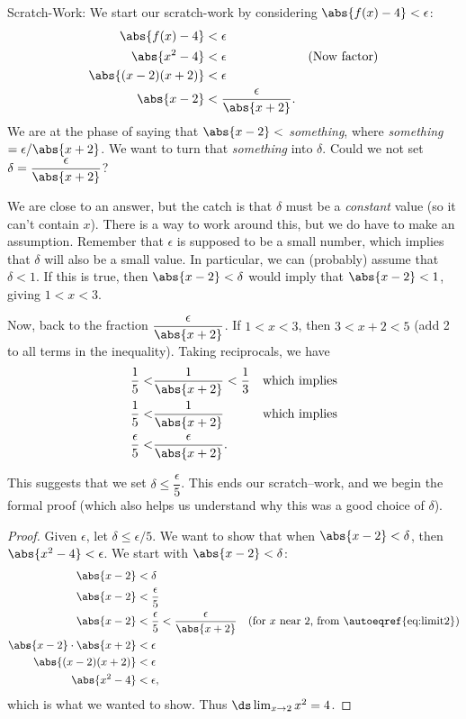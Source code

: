 {Scratch-Work:
We start our scratch-work by considering $\abs{f(x)-4}<\epsilon$:
\begin{align}
\abs{f(x)-4} &< \epsilon \notag\\
\abs{x^2-4} &< \epsilon & \text{(Now factor)}\notag\\
\abs{(x-2)(x+2)} &< \epsilon \notag\\
\abs{x-2} &<\frac{\epsilon}{\abs{x+2}}.\label{eq:lim1}
\end{align}
We are at the phase of saying that $\abs{x-2}<$ \textit{something}, where \textit{something}$=\epsilon/\abs{x+2}$. We want to turn that \textit{something} into $\delta$. Could we not set $\delta = \dfrac{\epsilon}{\abs{x+2}}$?  

We are close to an answer, but the catch is that $\delta$ must be a \textit{constant} value (so it can't contain $x$).  There is a way to work around this, but we do have to make an assumption.  Remember that $\epsilon$ is supposed to be a small number, which implies that $\delta$ will also be a small value.  In particular, we can (probably) assume that $\delta < 1$.  If this is true, then $\abs{x-2}< \delta$ would imply that $\abs{x-2}< 1$, giving $1 < x < 3$.  

Now, back to the fraction $\dfrac{\epsilon}{\abs{x+2}}$.  If $1<x<3$, then $3<x+2<5$ (add 2 to all terms in the inequality).  Taking reciprocals, we have 
\begin{align}
\frac15 <& \frac1{\abs{x+2}} < \frac 13 & \text{which implies}\notag\\
\frac15 <& \frac1{\abs{x+2}} & \text{which implies}\notag\\
\frac\epsilon5<&\frac{\epsilon}{\abs{x+2}}\text{.}\label{eq:limit2}
\end{align}

This suggests that we set 
$\delta \leq \dfrac{\epsilon}{5}$. This ends our scratch--work, and we begin the formal proof (which also helps us understand why this was a good choice of $\delta$).

\begin{proof}
Given $\epsilon$, let $\delta \leq \epsilon/5$. We want to show that when $\abs{x-2}<\delta$, then $\abs{x^2-4}<\epsilon$. We start with $\abs{x-2}<\delta$:
\begin{align*}
\abs{x-2} &< \delta \\
\abs{x-2} &< \frac{\epsilon}5\\
\abs{x-2} &< \frac\epsilon5 < \frac{\epsilon}{\abs{x+2}} & \text{(for $x$ near 2, from \autoeqref{eq:limit2})}\\
\abs{x-2}\cdot\abs{x+2} &< \epsilon\\
\abs{(x-2)(x+2)} &< \epsilon\\
\abs{x^2-4} &<\epsilon,
\end{align*}
which is what we wanted to show. Thus $\ds \lim_{x\to 2}x^2 = 4$.
\end{proof}

}
